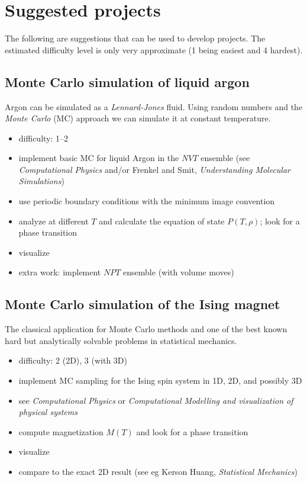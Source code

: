 \documentclass[letterpaper]{scrartcl}
\begin{document}
\section{Suggested projects}
\label{sec:suggestions}

The following are suggestions that can be used to develop
projects. The estimated difficulty level is only very approximate (1
being easiest and 4 hardest).

\subsection{Monte Carlo simulation of liquid argon}

Argon can be simulated as a \emph{Lennard-Jones} fluid. Using random
numbers and the \emph{Monte Carlo} (MC) approach we can simulate it at
constant temperature.

\begin{itemize}
\item difficulty: 1--2
\item implement basic MC for liquid Argon in the $NVT$ ensemble (see
  \emph{Computational Physics} and/or Frenkel and Smit,
  \emph{Understanding Molecular Simulations})
\item use periodic boundary conditions with the minimum image
  convention
\item analyze at different $T$ and calculate the equation of state
  $P(T, \rho)$; look for a phase transition
\item visualize
\item extra work: implement $NPT$ ensemble (with volume moves)
\end{itemize}


\subsection{Monte Carlo simulation of the Ising magnet}

The classical application for Monte Carlo methods and one of the best
known hard but analytically solvable problems in statistical
mechanics.

\begin{itemize}
\item difficulty: 2 (2D), 3 (with 3D)
\item implement MC sampling for the Ising spin system in 1D, 2D, and
  possibly 3D
\item see \emph{Computational Physics} or \emph{Computational
    Modelling and visualization of physical systems}
\item compute magnetization $M(T)$ and look for a phase transition
\item visualize
\item compare to the exact 2D result (see eg Kerson Huang,
  \emph{Statistical Mechanics})
\end{itemize}
\end{document}
